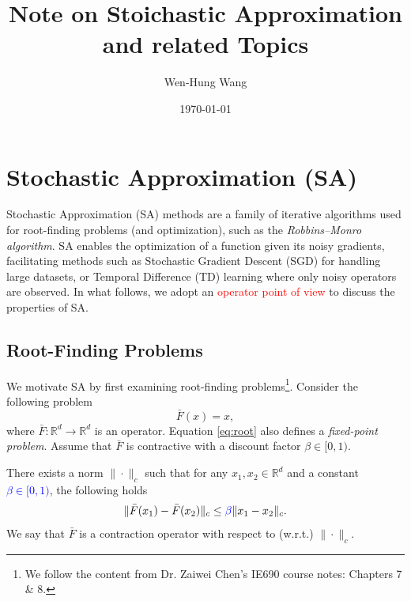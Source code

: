\documentclass[11pt,twoside]{article}
\title{Note on Stoichastic Approximation and related Topics}
\author{Wen-Hung Wang}
\date{\today}
\begin{document}
\maketitle
\tableofcontents
\clearpage

\section{Stochastic Approximation (SA)}
Stochastic Approximation (SA) methods are a family of iterative algorithms used for root-finding problems (and optimization), such as the \emph{Robbins–Monro algorithm}. SA enables the optimization of a function given its noisy gradients, facilitating methods such as Stochastic Gradient Descent (SGD) for handling large datasets, or Temporal Difference (TD) learning where only noisy operators are observed. In what follows, we adopt an \textcolor{red}{operator point of view} to discuss the properties of SA.

\subsection{Root-Finding Problems}
We motivate SA by first examining root-finding problems\footnote{We follow the content from Dr. Zaiwei Chen's IE690 course notes: Chapters 7 \& 8.}. Consider the following problem
\begin{equation}
\label{eq:root}
    \bar{F}(x) = x,
\end{equation}
where $\bar{F}: \mathbb R^d \to \mathbb R^d$ is an operator. Equation \eqref{eq:root} also defines a \emph{fixed-point problem}. Assume that $\bar{F}$ is contractive with a discount factor $\beta \in [0, 1)$.

\begin{assumption}
    \label{ass:contractive}
    There exists a norm $\|\cdot\|_c$ such that 
    for any $x_1,x_2 \in \mathbb{R}^d$ and a constant \textcolor{blue}{$\beta \in [0, 1)$}, the following holds
    \[
    \|\bar{F}(x_1) - \bar{F}(x_2)\|_c \leq \textcolor{blue}{\beta} \|x_1-x_2\|_c.
    \]
    We say that $\bar F$ is a contraction operator with respect to (w.r.t.) $\|\cdot\|_c$.
\end{assumption}
\end{document}
